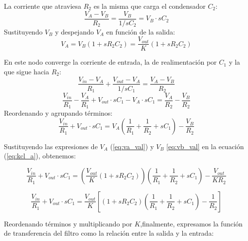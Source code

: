 La corriente que atraviesa $R_2$ es la misma que carga el condensador $C_2$:
\begin{equation}
    \frac{V_A - V_B}{R_2} = \frac{V_B}{1/sC_2} = V_B \cdot sC_2
\end{equation}
Sustituyendo $V_B$ y despejando $V_A$ en función de la salida:
\begin{equation}\label{eq:va_val}
    V_A = V_B (1 + sR_2C_2) = \frac{V_{out}}{K} (1 + sR_2C_2)
\end{equation}


En este nodo converge la corriente de entrada, la de realimentación por $C_1$ y la que sigue hacia $R_2$:
\begin{equation}
    \frac{V_{in} - V_A}{R_1} + \frac{V_{out} - V_A}{1/sC_1} = \frac{V_A - V_B}{R_2}
\end{equation}
\begin{equation}
    \frac{V_{in}}{R_1} - \frac{V_A}{R_1} + V_{out} \cdot sC_1 - V_A \cdot sC_1 = \frac{V_A}{R_2}- \frac{V_B}{R_2}
\end{equation}
Reordenando y agrupando términos:
\begin{equation}\label{eq:kcl_a}
    \frac{V_{in}}{R_1} + V_{out} \cdot sC_1 = V_A \left( \frac{1}{R_1} + \frac{1}{R_2} + sC_1 \right) - \frac{V_B}{R_2}
\end{equation}


Sustituyendo las expresiones de $V_A$ (\ref{eq:va_val}) y $V_B$ \eqref{eq:vb_val} en la ecuación (\ref{eq:kcl_a}), obtenemos:

\begin{equation}
    \frac{V_{in}}{R_1} + V_{out} \cdot sC_1 = \left( \frac{V_{out}}{K} (1 + sR_2C_2) \right) \left( \frac{1}{R_1} + \frac{1}{R_2} + sC_1 \right) - \frac{V_{out}}{KR_2}
\end{equation}

\begin{equation}\label{eq:kcl_final}
\frac{V_{in}}{R_1} + V_{out} \cdot sC_1 = \frac{V_{out}}{K} \left[ (1 + sR_2C_2) \left( \frac{1}{R_1} + \frac{1}{R_2} + sC_1 \right) - \frac{1}{R_2} \right]
\end{equation}

Reordenando términos y multiplicando por $K$,finalmente, expresamos la función de transferencia del filtro como la relación entre la salida y la entrada:


